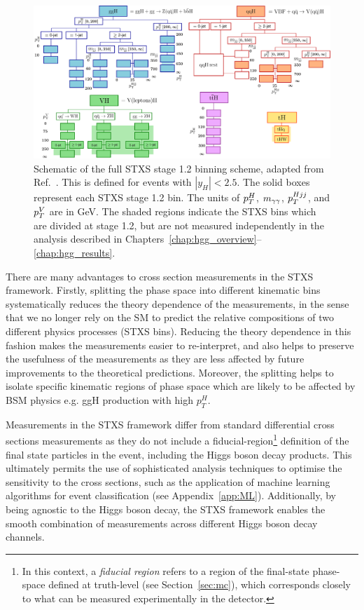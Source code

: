 \begin{figure}
  \centering
  \includegraphics[width=1\linewidth]{Figures/theory/allSTXSbins.pdf}
  \caption[STXS stage 1.2 binning scheme]
  {
    Schematic of the full STXS stage 1.2 binning scheme, adapted from Ref.~\cite{deFlorian:2016spz}. This is defined for events with $|y_H|<2.5$. The solid boxes represent each STXS stage 1.2 bin. The units of $p_T^H$, $m_{\gamma\gamma}$, $p_T^{Hjj}$, and $p_T^V$ are in GeV. The shaded regions indicate the STXS bins which are divided at stage 1.2, but are not measured independently in the \Hgg analysis described in Chapters~\ref{chap:hgg_overview}--\ref{chap:hgg_results}.
  }
  \label{fig:stxs_schematic}
\end{figure}

There are many advantages to cross section measurements in the STXS framework. Firstly, splitting the phase space into different kinematic bins systematically reduces the theory dependence of the measurements, in the sense that we no longer rely on the SM to predict the relative compositions of two different physics processes (STXS bins). Reducing the theory dependence in this fashion makes the measurements easier to re-interpret, and also helps to preserve the usefulness of the measurements as they are less affected by future improvements to the theoretical predictions. Moreover, the splitting helps to isolate specific kinematic regions of phase space which are likely to be affected by BSM physics e.g. ggH production with high $p_T^H$. 

Measurements in the STXS framework differ from standard differential cross sections measurements as they do not include a fiducial-region\footnote{In this context, a \textit{fiducial region} refers to a region of the final-state phase-space defined at truth-level (see Section~\ref{sec:mc}), which corresponds closely to what can be measured experimentally in the detector.} definition of the final state particles in the event, including the Higgs boson decay products. This ultimately permits the use of sophisticated analysis techniques to optimise the sensitivity to the cross sections, such as the application of machine learning algorithms for event classification (see Appendix~\ref{app:ML}). Additionally, by being agnostic to the Higgs boson decay, the STXS framework enables the smooth combination of measurements across different Higgs boson decay channels. 

